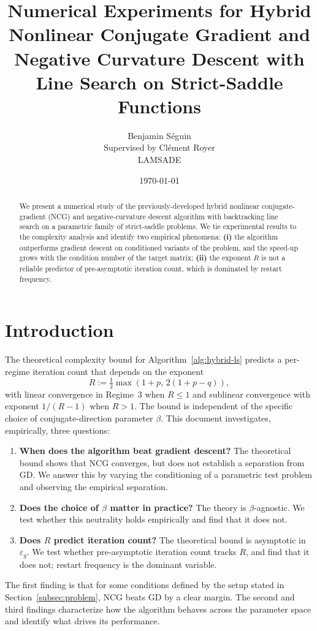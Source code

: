 \documentclass[11pt,a4paper]{article}
\title{Numerical Experiments for Hybrid Nonlinear Conjugate Gradient and Negative Curvature Descent with Line Search on Strict-Saddle Functions}
\author{Benjamin Séguin\\ \small Supervised by Clément Royer \\ \small LAMSADE}
\date{\today}
\theoremstyle{plain}
\theoremstyle{definition}
\newcommand{\epsg}{\varepsilon_{g}}
\begin{document}
\maketitle

\begin{abstract}
We present a numerical study of the previously-developed hybrid nonlinear 
conjugate-gradient (NCG) and negative-curvature descent algorithm with 
backtracking line search on a parametric family of strict-saddle problems. 
We tie experimental results to the complexity analysis and identify two 
empirical phenomena: \textbf{(i)} the algorithm outperforms gradient descent 
on conditioned variants of the problem, and the speed-up grows with the 
condition number of the target matrix; \textbf{(ii)} 
the exponent $R$ is not a reliable predictor of 
pre-asymptotic iteration count, which is dominated by restart frequency.
\end{abstract}

\tableofcontents

\section{Introduction}\label{sec:intro}

The theoretical complexity bound for Algorithm~\ref{alg:hybrid-ls} predicts a 
per-regime iteration count that depends on the exponent
\[
  R := \tfrac{1}{2}\max(1+p,\, 2(1+p-q)),
\]
with linear convergence in Regime~3 when $R \leq 1$ and sublinear 
convergence with exponent $1/(R-1)$ when $R > 1$. The bound is 
independent of the specific choice of conjugate-direction parameter $\beta$. 
This document investigates, empirically, three questions:
\begin{enumerate}[leftmargin=2em]
  \item \textbf{When does the algorithm beat gradient descent?} The theoretical bound shows that NCG converges, but does not establish a separation from GD. We answer this by varying the conditioning of a parametric test problem and observing the empirical separation.
  \item \textbf{Does the choice of $\beta$ matter in practice?} The theory is $\beta$-agnostic. We test whether this neutrality holds empirically and find that it does not.
  \item \textbf{Does $R$ predict iteration count?} The theoretical bound is asymptotic in $\epsg$. We test whether pre-asymptotic iteration count tracks $R$, and find that it does not; restart frequency is the dominant variable.
\end{enumerate}
The first finding is that for some conditions defined by the setup stated in Section~\ref{subsec:problem}, 
NCG beats GD by a clear margin. The second and third findings characterize 
how the algorithm behaves across the parameter space and identify what drives
its performance.
\end{document}
